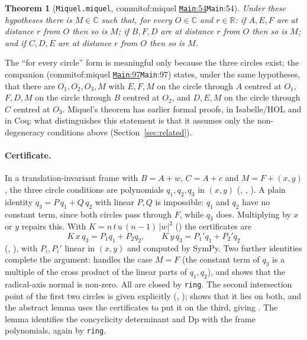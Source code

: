 \documentclass[11pt]{article}
\newtheorem{theorem}{Theorem}
\theoremstyle{definition}
\theoremstyle{remark}
\newcommand{\lean}[1]{\texttt{#1}}
\newcommand{\RR}{\mathbb{R}}
\newcommand{\CC}{\mathbb{C}}
\newcommand{\commitof}[1]{\csname commitof:#1\endcsname}
\newcommand{\repo}[1]{https://github.com/jpbald93/#1}
\newcommand{\src}[4]{\ifcsname commitof:#1\endcsname
  \href{\repo{#1}/blob/\commitof{#1}/#2/#3.lean\#L#4}{\texttt{#3}:#4}\else\texttt{#3}:#4\fi}
\begin{document}
\begin{theorem}[\texttt{Miquel.miquel}, \src{miquel}{Miquel}{Main}{54}]\label{thm:miquel}
Under these hypotheses there is $M\in\CC$ such that, for every $O\in\CC$ and $r\in\RR$: if
$A,E,F$ are at distance $r$ from $O$ then so is $M$; if $B,F,D$ are at distance $r$ from $O$ then
so is $M$; and if $C,D,E$ are at distance $r$ from $O$ then so is $M$.
\end{theorem}

The ``for every circle'' form is meaningful only because the three circles exist; the companion
 (\src{miquel}{Miquel}{Main}{97}) states, under the same hypotheses,
that there are $O_1,O_2,O_3,M$ with $E,F,M$ on the circle through $A$ centred at $O_1$, $F,D,M$ on
the circle through $B$ centred at $O_2$, and $D,E,M$ on the circle through $C$ centred at $O_3$.
Miquel's theorem has earlier formal proofs, in Isabelle/HOL and in Coq; what distinguishes this
statement is that it assumes only the non-degeneracy conditions above (Section~\ref{sec:related}).

\paragraph{Certificate.} In a translation-invariant frame with $B=A+w$, $C=A+c$ and $M=F+(x,y)$,
the three circle conditions are polynomials $q_1,q_2,q_3$ in $(x,y)$ (, ,
). A plain identity $q_3=P\,q_1+Q\,q_2$ with linear $P,Q$ is impossible: $q_1$ and
$q_2$ have no constant term, since both circles pass through $F$, while $q_3$ does. Multiplying by
$x$ or $y$ repairs this. With $K=n\,t\,u\,(n-1)\,|w|^2$ () the certificates are
\[
K\,x\,q_3=P_1q_1+P_2q_2,\qquad K\,y\,q_3=P_1'q_1+P_2'q_2
\]
(, ), with $P_i,P_i'$ linear in $(x,y)$ and computed by
SymPy. Two further identities complete the argument:  handles the case $M=F$
(the constant term of $q_3$ is a multiple of the cross product of the linear parts of $q_1,q_2$),
and  shows that the radical-axis normal is non-zero. All are closed by
\lean{ring}. The second intersection point of the first two circles is given explicitly
(, );  shows that it lies on both, and the
abstract lemma  uses the certificates to put it on the third, giving
. The lemma  identifies the concyclicity determinant
 and $\mathrm{Dp}$ with the frame polynomials, again by \lean{ring}.
\end{document}
